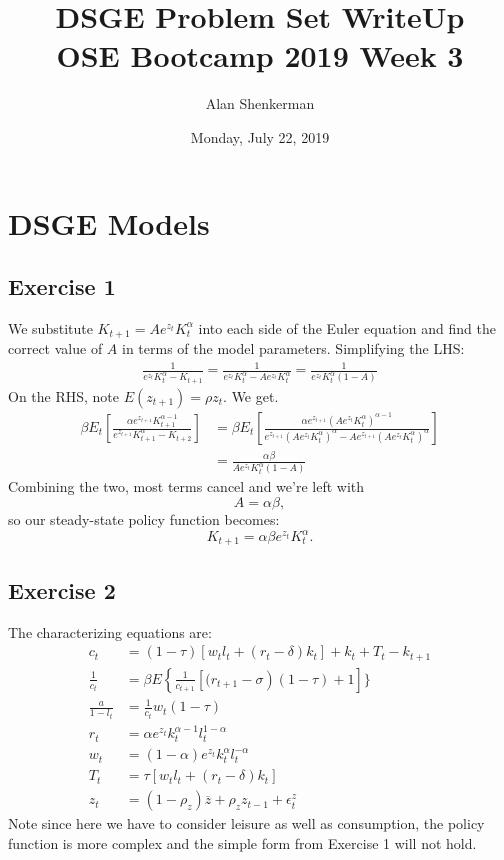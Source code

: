 \documentclass[UTF8]{article}
\begin{document}
\title{%
 \textbf{DSGE Problem Set WriteUp}  \\
 \large OSE Bootcamp 2019 Week 3 }
\author{Alan Shenkerman } 
\date{Monday, July 22, 2019}
\maketitle

\section*{DSGE Models}

\subsection*{Exercise 1}
We substitute $K_{t+1} = A e^{z_t} K_t^{\alpha}$ into each side of the Euler equation and find the correct value of $A$ in terms of the model parameters. Simplifying the LHS:
\begin{align*}
\frac{1}{e^{z_t}K_t^{\alpha} - K_{t+1}}  = \frac{1}{e^{z_t}K_t^{\alpha} - A e^{z_t} K_t^{\alpha}} = \frac{1}{e^{z_t} K_t^{\alpha} (1 - A)}
\end{align*}
On the RHS, note $E(z_{t+1}) = \rho z_t$. We get.
\begin{align*}
\beta E_t \left[ \frac{\alpha e^{z_{t +1}} K_{t+1}^{\alpha -1}}{ e^{z_{t +1}} K_{t+1}^{\alpha} - K_{t+2}}  \right]  &= \beta E_t \left[ \frac{\alpha e^{z_{t +1}} (A e^{z_t} K_t^{\alpha})^{\alpha -1}}{ e^{z_{t +1}} (A e^{z_t} K_t^{\alpha})^{\alpha} - Ae^{z_{t+1}} (Ae^{z_t} K_t^{\alpha})^{\alpha}}  \right]  \\
&= \frac{\alpha \beta}{Ae^{z_t}K_t^{\alpha}(1-A)}
\end{align*}
Combining the two, most terms cancel and we're left with 
$$A = \alpha \beta,$$ so our steady-state policy function becomes:
$$K_{t+1} = \alpha \beta e^{z_t} K_t^\alpha.$$

\subsection*{Exercise 2}
The characterizing equations are:
\begin{align*}
c_{t}&=(1-\tau)\left[w_{t} l_{t}+\left(r_{t}-\delta\right) k_{t}\right]+k_{t}+T_{t}-k_{t+1} \\
\frac{1}{c_{t}}&=\beta E\left\{\frac{1}{c_{t+1}}\left[(r_{t+1}-\sigma\right)(1-\tau)+1\right] \} \\
\frac{a}{1-l_{t}}&=\frac{1}{c_{t}} w_{t}(1-\tau) \\
r_{t}&=\alpha e^{z_{t}} k_{t}^{\alpha-1} l_{t}^{1-\alpha} \\ 
w_{t}&=(1-\alpha) e^{z_t} k_{t}^{\alpha} l_{t}^{-\alpha} \\
T_t &= \tau\left[w_{t} l_{t}+\left(r_{t}-\delta\right) k_{t}\right] \\
z_{t}&=\left(1-\rho_{z}\right) \overline{z}+\rho_{z} z_{t-1}+\epsilon_{t}^{z}
\end{align*}
Note since here we have to consider leisure as well as consumption, the policy function is more complex and the simple form from Exercise 1 will not hold. 
\end{document}
